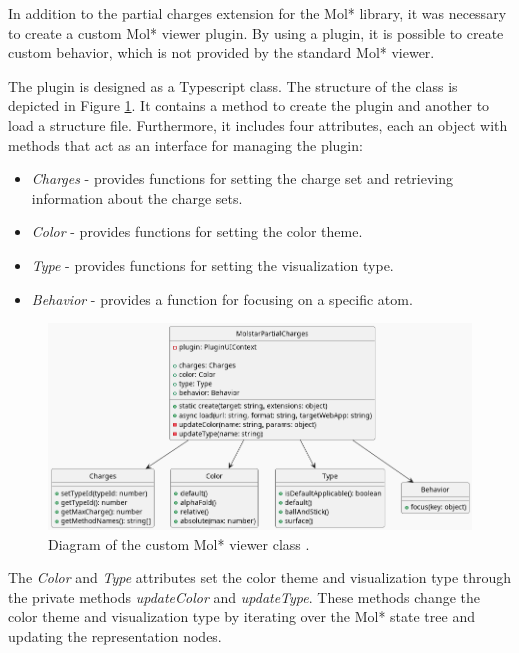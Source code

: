\documentclass[
  digital,     %
  oneside,     %
  nosansbold,  %
  nocolorbold, %
  lof,         %
  lot,         %
]{fithesis4}
\begin{document}
In addition to the partial charges extension for the Mol* library, it was necessary to create a custom Mol* viewer plugin. By using a plugin, it is possible to create custom behavior, which is not provided by the standard Mol* viewer.

The plugin is designed as a Typescript class. The structure of the class is depicted in Figure \ref{fig:plugin_structure}. It contains a method to create the plugin and another to load a structure file. Furthermore, it includes four attributes, each an object with methods that act as an interface for managing the plugin:

\begin{itemize}
  \item \textit{Charges} - provides functions for setting the charge set and retrieving information about the charge sets.
  \item \textit{Color} - provides functions for setting the color theme.
  \item \textit{Type} - provides functions for setting the visualization type.
  \item \textit{Behavior} - provides a function for focusing on a specific atom.
\end{itemize}

\begin{figure}[htbp]
  \begin{center}
    \includegraphics[width=\textwidth]{out/figures/uml/viewer/viewer.png}
  \end{center}
  \caption{Diagram of the custom Mol* viewer class .}
  \label{fig:plugin_structure}
\end{figure}

The \textit{Color} and \textit{Type} attributes set the color theme and visualization type through the private methods \textit{updateColor} and \textit{updateType}. These methods change the color theme and visualization type by iterating over the Mol* state tree and updating the representation nodes.
\end{document}
